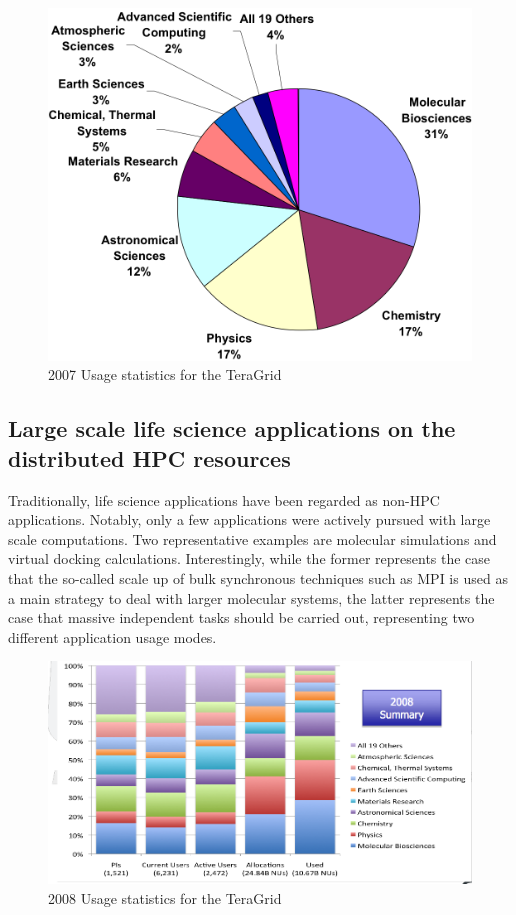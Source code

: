 \documentclass{sig-alternate}
\begin{document}


\begin{figure}
 \centering
\includegraphics[scale=0.40]{figures/teragrid-discipline07}
\caption{\small 2007 Usage statistics for the TeraGrid} 
  \label{tg2007}
\end{figure}


\subsection{Large scale life science applications on the distributed HPC resources}
Traditionally, life science applications have been regarded as non-HPC
applications.  Notably, only a few applications were actively pursued with
large scale computations.  Two representative examples are molecular
simulations and virtual docking calculations.  Interestingly, while
the former represents the case that the so-called scale up of bulk
synchronous techniques such as MPI is used as a main strategy to deal with
larger molecular systems, the latter represents the case that massive
independent tasks should be carried out, representing two different
application usage modes.

\begin{figure}
 \centering
\includegraphics[scale=0.27]{figures/teragrid-discipline08}
\caption{\small 2008 Usage statistics for the TeraGrid}
  \label{tg2008}
\end{figure}
\end{document}

